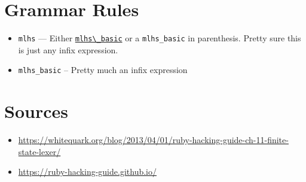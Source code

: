 \documentclass[11pt]{article}
\begin{document}
\section{Grammar Rules}
\label{sec-7}
\begin{itemize}
\item \label{mlhs} \verb~mlhs~ --- Either \hyperref[mlhs_basic]{\verb~mlhs\_basic~} or a \verb~mlhs_basic~ in
parenthesis. Pretty sure this is just any infix expression.
\item \label{mlhs_basic} \verb~mlhs_basic~ -- Pretty much an infix expression
\end{itemize}

\section{Sources}
\label{sec-8}

\begin{itemize}
\item \url{https://whitequark.org/blog/2013/04/01/ruby-hacking-guide-ch-11-finite-state-lexer/}
\item \url{https://ruby-hacking-guide.github.io/}
\end{itemize}
\end{document}

